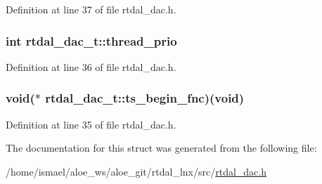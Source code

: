 Definition at line 37 of file rtdal\-\_\-dac.\-h.

\hypertarget{structrtdal__dac__t_a70fef8cd567be40adeab9ca4c30ab235}{
\subsubsection[{thread\-\_\-prio}]{\setlength{\rightskip}{0pt plus 5cm}int rtdal\-\_\-dac\-\_\-t\-::thread\-\_\-prio}}\label{structrtdal__dac__t_a70fef8cd567be40adeab9ca4c30ab235}


Definition at line 36 of file rtdal\-\_\-dac.\-h.

\hypertarget{structrtdal__dac__t_a1ac668320b27721486d68e597e95d040}{
\subsubsection[{ts\-\_\-begin\-\_\-fnc}]{\setlength{\rightskip}{0pt plus 5cm}void($\ast$ rtdal\-\_\-dac\-\_\-t\-::ts\-\_\-begin\-\_\-fnc)(void)}}\label{structrtdal__dac__t_a1ac668320b27721486d68e597e95d040}


Definition at line 35 of file rtdal\-\_\-dac.\-h.



The documentation for this struct was generated from the following file\-:\begin{DoxyCompactItemize}
\item 
/home/ismael/aloe\-\_\-ws/aloe\-\_\-git/rtdal\-\_\-lnx/src/\hyperlink{rtdal__dac_8h}{rtdal\-\_\-dac.\-h}\end{DoxyCompactItemize}
